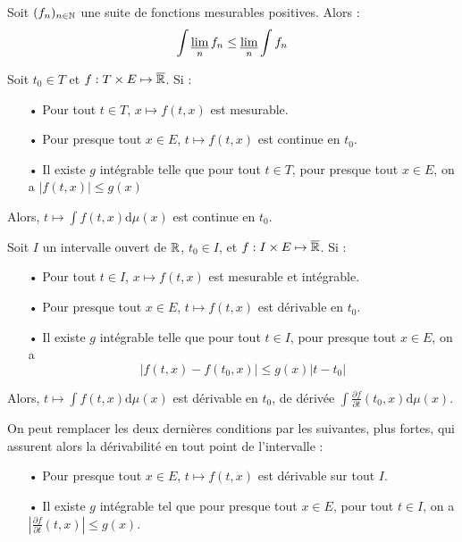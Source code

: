 \documentclass[11pt,a4paper]{article}
\begin{document}
\begin{lemma}[Fatou]
Soit $(f_n)_{n\in\mathbb N}$ une suite de fonctions mesurables positives. Alors :
\[\int \varliminf_n f_n \leq \varliminf_n \int f_n\]
\end{lemma}


\begin{prop}
Soit $t_0 \in T$  et $f : T \times E \mapsto \overline{\mathbb R} $. Si :
\begin{itemize}
\item[•] Pour tout $t\in T$, $x\mapsto f(t,x)$ est mesurable.
\item[•] Pour presque tout $x \in E$, $t\mapsto f(t,x)$ est continue en $t_0$.
\item[•] Il existe $g$ intégrable telle que pour tout $t\in T$, pour presque tout $x \in E$, on a $\left| f(t,x) \right| \leq g(x)$
\end{itemize}
Alors, $t\mapsto \displaystyle \int f(t,x)\mathrm{d}\mu(x)$ est continue en $t_0$.
\end{prop}


\begin{prop}
Soit $I$ un intervalle ouvert de $\mathbb R$, $t_0 \in I$, et $f:I \times E \mapsto \overline{\mathbb R}$. Si :
\begin{itemize}
\item[•] Pour tout $t\in I$, $x\mapsto f(t,x)$ est mesurable et intégrable.
\item[•] Pour presque tout $x \in E$, $t\mapsto f(t,x)$ est dérivable en $t_0$.
\item[•] Il existe $g$ intégrable telle que pour tout $t\in I$, pour presque tout $x \in E$, on a \[\left| f(t,x) - f(t_0,x) \right| \leq g(x) \left|t-t_0\right|\]
\end{itemize}
Alors, $t\mapsto \displaystyle \int f(t,x)\mathrm{d}\mu(x)$ est dérivable en $t_0$, de dérivée $\displaystyle \int \frac{\partial f}{\partial t} (t_0,x)\mathrm{d}\mu(x)$.
\end{prop}


\begin{rmq}
On peut remplacer les deux dernières conditions par les suivantes, plus fortes, qui assurent alors la dérivabilité en tout point de l'intervalle :
\begin{itemize}
\item[•] Pour presque tout $x \in E$, $t\mapsto f(t,x)$ est dérivable sur tout $I$.
\item[•] Il existe $g$ intégrable tel que pour presque tout $x\in E$, pour tout $t\in I$, on a $\displaystyle \left| \frac{\partial f}{\partial t}(t,x) \right| \leq g(x)$.
\end{itemize}
\end{rmq}
\end{document}
